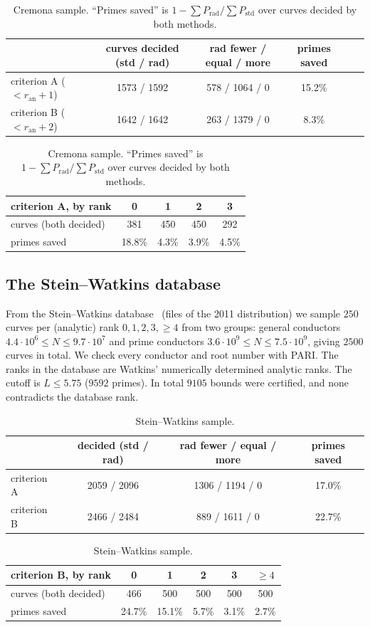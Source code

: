 \documentclass[11pt]{amsart}
\theoremstyle{remark}
\theoremstyle{definition}
\newcommand{\ran}{r_{\mathrm{an}}}
\begin{document}
\begin{table}[h]
\centering\small
\begin{tabular}{lccccc}
\toprule
 & curves decided (std / rad) & rad fewer / equal / more & primes saved\\
\midrule
criterion A ($<\ran+1$) & 1573 / 1592 & 578 / 1064 / 0 & 15.2\%\\
criterion B ($<\ran+2$) & 1642 / 1642 & 263 / 1379 / 0 & \phantom{1}8.3\%\\
\bottomrule
\end{tabular}

\smallskip
\begin{tabular}{lcccc}
\toprule
criterion A, by rank & 0 & 1 & 2 & 3\\
\midrule
curves (both decided) & 381 & 450 & 450 & 292\\
primes saved & 18.8\% & 4.3\% & 3.9\% & 4.5\%\\
\bottomrule
\end{tabular}
\caption{Cremona sample. ``Primes saved'' is $1-\sum P_{\mathrm{rad}}/\sum P_{\mathrm{std}}$ over curves decided by both methods.}
\label{tab:cremona}
\end{table}

\subsection{The Stein--Watkins database}
From the Stein--Watkins database~\cite{SW} (files of the 2011 distribution) we sample $250$ curves per (analytic) rank $0,1,2,3,\ge4$ from two groups: general conductors $4.4\cdot10^6\le N\le9.7\cdot10^7$ and prime conductors $3.6\cdot10^9\le N\le7.5\cdot10^9$, giving $2500$ curves in total. We check every conductor and root number with PARI. The ranks in the database are Watkins' numerically determined analytic ranks. The cutoff is $L\le5.75$ ($9592$ primes). In total $9105$ bounds were certified, and none contradicts the database rank.

\begin{table}[h]
\centering\small
\begin{tabular}{lccc}
\toprule
 & decided (std / rad) & rad fewer / equal / more & primes saved\\
\midrule
criterion A & 2059 / 2096 & 1306 / 1194 / 0 & 17.0\%\\
criterion B & 2466 / 2484 & \phantom{1}889 / 1611 / 0 & 22.7\%\\
\bottomrule
\end{tabular}

\smallskip
\begin{tabular}{lccccc}
\toprule
criterion B, by rank & 0 & 1 & 2 & 3 & $\ge4$\\
\midrule
curves (both decided) & 466 & 500 & 500 & 500 & 500\\
primes saved & 24.7\% & 15.1\% & 5.7\% & 3.1\% & 2.7\%\\
\bottomrule
\end{tabular}
\caption{Stein--Watkins sample.}
\label{tab:sw}
\end{table}
\end{document}
